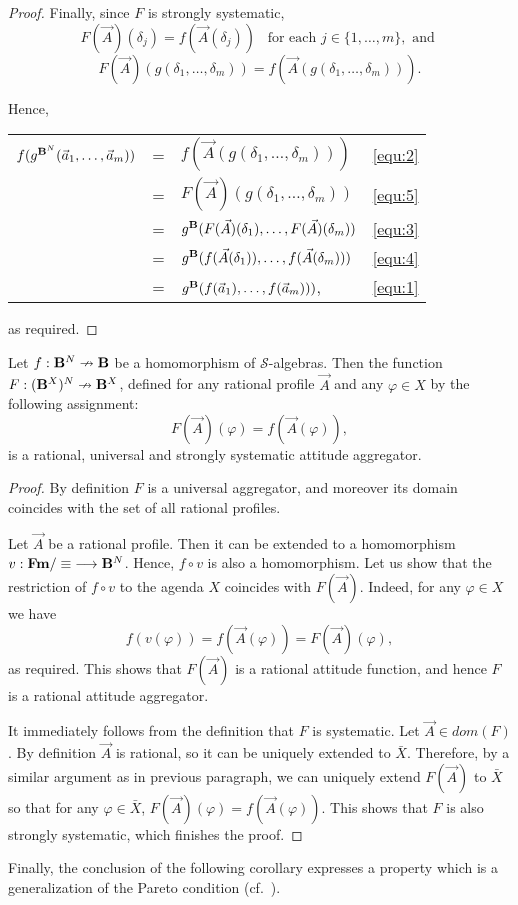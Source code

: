 \documentclass{llncs}
\numberwithin{equation}{section}
\newcommand{\SSS}{\mathcal{S}}
\begin{document}
\begin{proof}
Finally, since $F$ is strongly systematic,
\begin{equation}\label{equ:4}
F(\vec{A})(\delta_{j})=f(\vec{A}(\delta_{j})) \,\,\, \text{ for each } j\in\{1,\dots,m\}, \text{ and }
\end{equation}
\begin{equation}\label{equ:5}
F(\vec{A})(g(\delta_{1},\dots,\delta_{m}))= f(\vec{A}(g(\delta_{1},\dots,\delta_{m}))).
\end{equation}

Hence,

\begin{center}
\begin{tabular}{r c l l}
$f(g^{\mathbf{B}^{N}}(\vec{a}_{1},\dots,\vec{a}_{m}))$&=&$f(\vec{A}(g(\delta_{1},\dots,\delta_{m})))$ & \eqref{equ:2}\\
&=&$F(\vec{A})(g(\delta_{1},\dots,\delta_{m}))$& \eqref{equ:5}\\
&=&$g^{\mathbf{B}}(F(\vec{A})(\delta_{1}),\dots,F(\vec{A})(\delta_{m}))$& \eqref{equ:3}\\
&=&$g^{\mathbf{B}}(f(\vec{A}(\delta_{1})),\dots,f(\vec{A}(\delta_{m})))$& \eqref{equ:4}\\
&=&$g^{\mathbf{B}}(f(\vec{a}_{1}),\dots,f(\vec{a}_{m})))$,& \eqref{equ:1}
\end{tabular}
\end{center}

as required.
\end{proof}
\begin{proposition}\label{prop2}
Let $f:\mathbf{B}^{N}\nrightarrow \mathbf{B}$ be a homomorphism of $\SSS$-algebras. Then the function $F:(\mathbf{B}^{X})^{N} \nrightarrow \mathbf{B}^{X}$, defined for any rational profile $\vec{A}$ and any $\varphi\in X$ by the following assignment: $$F(\vec{A})(\varphi)=f(\vec{A}(\varphi)),$$ is a rational, universal and strongly systematic attitude aggregator.
\end{proposition}
\begin{proof}
By definition $F$ is a universal aggregator, and moreover its domain coincides with the set of all rational profiles.

Let $\vec{A}$ be a rational profile. Then it can be extended to a homomorphism $v:{\mathbf{Fm}/\equiv}\longrightarrow \mathbf{B}^{N}$. Hence, $f\circ v$ is also a homomorphism. Let us show that the restriction of $f\circ v$ to the agenda $X$ coincides with $F(\vec{A})$. Indeed, for any $\varphi\in X$ we have $$f(v(\varphi))=f(\vec{A}(\varphi))=F(\vec{A})(\varphi),$$ as required. This shows that $F(\vec{A})$ is a rational attitude function, and hence $F$ is a rational attitude aggregator.

It immediately follows from the definition that $F$ is systematic. Let $\vec{A}\in dom(F)$. By definition $\vec{A}$ is rational, so it can be uniquely extended to $\bar{X}$. Therefore, by a similar argument as in previous paragraph, we can uniquely extend $F(\vec{A})$ to $\bar{X}$ so that for any $\varphi\in\bar{X}$, $F(\vec{A})(\varphi)=f(\vec{A}(\varphi))$. This shows that $F$ is also strongly systematic, which finishes the proof.
\end{proof}
Finally, the conclusion of the following corollary expresses a property which is a generalization of the Pareto condition (cf.\ \cite[Definition 3.7]{He13}).
\end{document}
